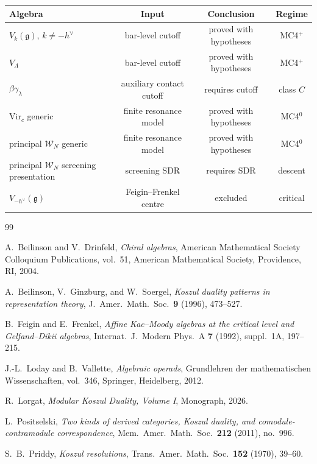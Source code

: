 \documentclass[11pt,reqno]{amsart}
\theoremstyle{definition}
\theoremstyle{remark}
\newcommand{\cW}{\mathcal{W}}
\newcommand{\fg}{\mathfrak{g}}
\newcommand{\Vir}{\mathrm{Vir}}
\numberwithin{equation}{section}
\begin{document}
\begin{center}
\begin{tabular}{lccc}
\toprule
Algebra & Input & Conclusion & Regime \\
\midrule
$V_k(\fg)$, $k\ne-h^\vee$ & bar-level cutoff & proved with hypotheses & MC4${}^+$ \\
$V_\Lambda$ & bar-level cutoff & proved with hypotheses & MC4${}^+$ \\
$\beta\gamma_\lambda$ & auxiliary contact cutoff & requires cutoff & class $C$ \\
$\Vir_c$ generic & finite resonance model & proved with hypotheses & MC4${}^0$ \\
principal $\cW_N$ generic & finite resonance model & proved with hypotheses & MC4${}^0$ \\
principal $\cW_N$ screening presentation & screening SDR & requires SDR & descent \\
$V_{-h^\vee}(\fg)$ & Feigin--Frenkel centre & excluded & critical \\
\bottomrule
\end{tabular}
\end{center}


\begin{thebibliography}{99}

A.~Beilinson and V.~Drinfeld,
\emph{Chiral algebras},
American Mathematical Society Colloquium Publications, vol.~51,
American Mathematical Society, Providence, RI, 2004.

A.~Beilinson, V.~Ginzburg, and W.~Soergel,
\emph{Koszul duality patterns in representation theory},
J.\ Amer.\ Math.\ Soc.\ \textbf{9} (1996), 473--527.

B.~Feigin and E.~Frenkel,
\emph{Affine Kac--Moody algebras at the critical level and
Gelfand--Dikii algebras},
Internat.\ J.\ Modern Phys.\ A \textbf{7} (1992), suppl.~1A,
197--215.

J.-L.~Loday and B.~Vallette,
\emph{Algebraic operads},
Grundlehren der mathematischen Wissenschaften, vol.~346,
Springer, Heidelberg, 2012.

R.~Lorgat,
\emph{Modular Koszul Duality, Volume I},
Monograph, 2026.

L.~Positselski,
\emph{Two kinds of derived categories, Koszul duality, and
comodule-contramodule correspondence},
Mem.\ Amer.\ Math.\ Soc.\ \textbf{212} (2011), no.~996.

S.~B.~Priddy,
\emph{Koszul resolutions},
Trans.\ Amer.\ Math.\ Soc.\ \textbf{152} (1970), 39--60.

\end{thebibliography}
\end{document}

